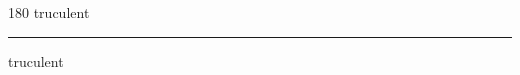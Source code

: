 
\begin{frame}
\begin{center}
\begin{turn}{180}
{\fontsize{2.5cm}{1em}\selectfont truculent}
\end{turn}
\vspace{1em}\par  
\hrule
\vspace{1em}\par  
{\fontsize{2.5cm}{1em}\selectfont truculent}
\end{center}
\end{frame}
